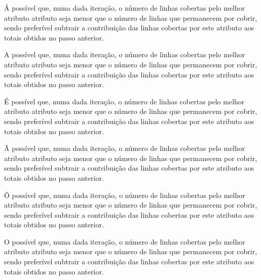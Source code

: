 \documentclass[portuguese,a4paper]{report}
\begin{document}
Á possível que, numa dada iteração, o número de
linhas cobertas pelo melhor atributo atributo
seja menor que o número de linhas que permanecem
por cobrir, sendo preferível subtrair a
contribuição das linhas cobertas por este
atributo aos totais obtidos no passo anterior.

A possível que, numa dada iteração, o número de
linhas cobertas pelo melhor atributo atributo
seja menor que o número de linhas que permanecem
por cobrir, sendo preferível subtrair a
contribuição das linhas cobertas por este
atributo aos totais obtidos no passo anterior.

É possível que, numa dada iteração, o número de
linhas cobertas pelo melhor atributo atributo
seja menor que o número de linhas que permanecem
por cobrir, sendo preferível subtrair a
contribuição das linhas cobertas por este
atributo aos totais obtidos no passo anterior.

Ã possível que, numa dada iteração, o número de
linhas cobertas pelo melhor atributo atributo
seja menor que o número de linhas que permanecem
por cobrir, sendo preferível subtrair a
contribuição das linhas cobertas por este
atributo aos totais obtidos no passo anterior.

Ô possível que, numa dada iteração, o número de
linhas cobertas pelo melhor atributo atributo
seja menor que o número de linhas que permanecem
por cobrir, sendo preferível subtrair a
contribuição das linhas cobertas por este
atributo aos totais obtidos no passo anterior.

O possível que, numa dada iteração, o número de
linhas cobertas pelo melhor atributo atributo
seja menor que o número de linhas que permanecem
por cobrir, sendo preferível subtrair a
contribuição das linhas cobertas por este
atributo aos totais obtidos no passo anterior.
\end{document}
